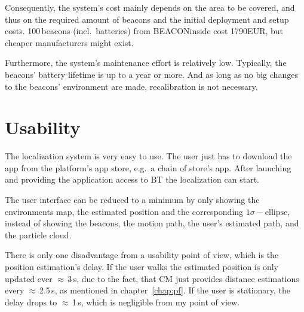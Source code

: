 Consequently, the system's cost mainly depends on the area to be covered, and thus on the required amount of beacons and the initial deployment and setup costs. 100\,beacons (incl.\ batteries) from BEACONinside cost 1790EUR, but cheaper manufacturers might exist.

Furthermore, the system's maintenance effort is relatively low. Typically, the beacons' battery lifetime is up to a year or more. And as long as no big changes to the beacons' environment are made, recalibration is not necessary.

\section{Usability}
The localization system is very easy to use. The user just has to download the app from the platform's app store, e.g.\ a chain of store's app. After launching and providing the application access to \acl{BT} the localization can start.

The user interface can be reduced to a minimum by only showing the environments map, the estimated position and the corresponding $1\sigma-\text{ellipse}$, instead of showing the beacons, the motion path, the user's estimated path, and the particle cloud.

There is only one disadvantage from a usability point of view, which is the position estimation's delay. If the user walks the estimated position is only updated ever $\approx$\,3\,s, due to the fact, that \acs{CM} just provides distance estimations every $\approx$\,2.5\,s, as mentioned in chapter~\ref{chap:pf}. If the user is stationary, the delay drops to $\approx$\,1\,s, which is negligible from my point of view.
